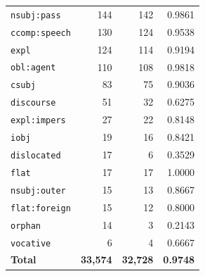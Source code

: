\begin{table}[ht]
\begin{tabular}{lrrr}
\texttt{nsubj\!:\!pass} & 144 & 142 & 0.9861 \\
\texttt{ccomp\!:\!speech} & 130 & 124 & 0.9538 \\
\texttt{expl} & 124 & 114 & 0.9194 \\
\texttt{obl\!:\!agent} & 110 & 108 & 0.9818 \\
\texttt{csubj} & 83 & 75 & 0.9036 \\
\texttt{discourse} & 51 & 32 & 0.6275 \\
\texttt{expl\!:\!impers} & 27 & 22 & 0.8148 \\
\texttt{iobj} & 19 & 16 & 0.8421 \\
\texttt{dislocated} & 17 & 6 & 0.3529 \\
\texttt{flat} & 17 & 17 & 1.0000 \\
\texttt{nsubj\!:\!outer} & 15 & 13 & 0.8667 \\
\texttt{flat\!:\!foreign} & 15 & 12 & 0.8000 \\
\texttt{orphan} & 14 & 3 & 0.2143 \\
\texttt{vocative} & 6 & 4 & 0.6667 \\
\midrule
\textbf{Total} & \textbf{33,574} & \textbf{32,728} & \textbf{0.9748} \\
\bottomrule
\end{tabular}
\end{table}
